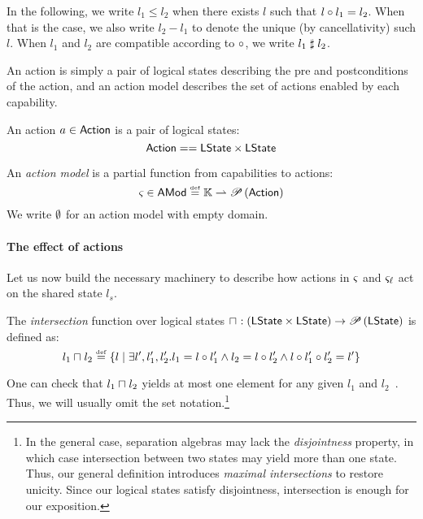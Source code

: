 In the following, we write $l_1\leq l_2$ when there exists $l$ such
that $l\circ l_1 = l_2$. When that is the case, we also write $l_2
- l_1$ to denote the unique (by cancellativity) such $l$. When $l_1$
and $l_2$ are compatible according to $\circ$, we write
$l_1\mathrel{\sharp} l_2$.

An action is simply a pair of logical states describing the pre and
postconditions of the action, and an action model describes the set of
actions enabled by each capability.

\begin{definition}[Action]
  An action $a\in\mathsf{Action}$ is a pair of logical states:
  \[
  \mathsf{Action} == \textsf{LState} \times \textsf{LState}
  \]
\end{definition}

\begin{definition}
An \emph{action model} is a partial function from capabilities to
actions:
\[
\varsigma_{} \in \textsf{AMod} \mathrel{\stackrel{\smash{\scriptscriptstyle{\mathrm{def}}}}{=}} \mathbb{K} \rightharpoonup \mathscr{P}\left(\mathsf{Action} \right)
\]
We write $\emptyset$ for an action model with empty domain.
\end{definition}


\paragraph{The effect of actions} Let us now build the necessary
machinery to describe how actions in $\varsigma_{}$ and $\varsigma_{\ell}$ act
on the shared state $l_s$.

\begin{definition}[Intersection]
The \emph{intersection} function over logical states 
$
\sqcap_{} : \left(\textsf{LState} \times \textsf{LState} \right) \rightarrow \mathscr{P}\left(\textsf{LState} \right)
$
is defined as:
\[
l_1 \sqcap_{} l_2 \mathrel{\stackrel{\smash{\scriptscriptstyle{\mathrm{def}}}}{=}} 
\left\{ 
l  \mid
\exists l', l_1', l_2'.\,\! l_1 = l \circ l_1' \land l_2 = l \circ l_2' \land l \circ l_1' \circ l_2' = l'
\right\}
\]
\end{definition}

One can check that $l_1\sqcap_{} l_2$ yields at most one element for any
given $l_1$ and $l_2$~\cite{colosl-tr14}. Thus, we will usually omit
the set notation.\footnote{In the general case, separation algebras
  may lack the \emph{disjointness} property, in which case
  intersection between two states may yield more than one state. Thus,
  our general definition introduces \emph{maximal intersections} to
  restore unicity. Since our logical states satisfy disjointness,
  intersection is enough for our exposition.}

